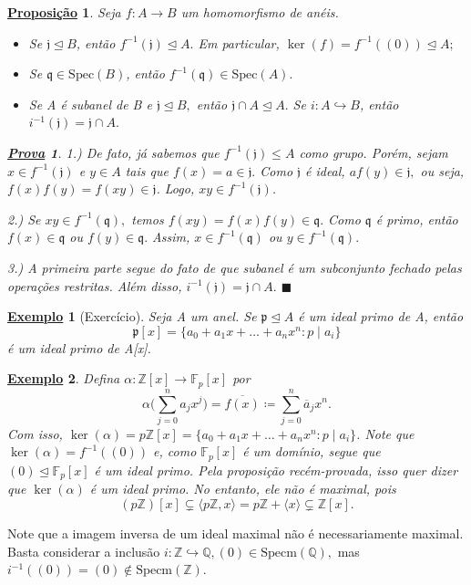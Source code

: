 \documentclass{article}
\newtheorem*{prop*}{\underline{Proposi\c c\~ao}}
\newtheorem{example}{\underline{Exemplo}}
\newtheorem*{proof*}{\underline{Prova}}
\renewcommand\qedsymbol{$\blacksquare$}
\begin{document}
\begin{prop*}
  Seja \(f:A\rightarrow B\) um homomorfismo de anéis.
  \begin{itemize}
    \item[1)] Se \(\mathfrak{j}\trianglelefteq{B}\), então \(f^{-1}(\mathfrak{j})\trianglelefteq{A}.\) Em particular, \(\ker{(f)} = f^{-1}((0))\trianglelefteq{A};\)
    \item[2)] Se \(\mathfrak{q}\in \mathrm{Spec}(B)\), então \(f^{-1}(\mathfrak{q})\in \mathrm{Spec}(A).\)
    \item[3)] Se A é subanel de B e \(\mathfrak{j}\trianglelefteq{B},\) então \(\mathfrak{j}\cap A \trianglelefteq{A}.\) Se \(i:A\hookrightarrow B\),
      então \(i^{-1}(\mathfrak{j})=\mathfrak{j}\cap A.\)
  \end{itemize}
  \begin{proof*}
    1.) De fato, já sabemos que \(f^{-1}(\mathfrak{j})\leq A\) como grupo. Porém, sejam \(x\in f^{-1}(\mathfrak{j})\)
    e \(y\in A\) tais que \(f(x) = a\in \mathfrak{j}.\) Como \(\mathfrak{j}\) é ideal, \(af(y)\in \mathfrak{j},\)
    ou seja, \(f(x)f(y) = f(xy)\in \mathfrak{j}\). Logo, \(xy\in f^{-1}(\mathfrak{j})\).

    2.) Se \(xy\in f^{-1}(\mathfrak{q}),\) temos \(f(xy) = f(x)f(y)\in \mathfrak{q}.\) Como \(\mathfrak{q}\) é primo, 
    então \(f(x)\in \mathfrak{q}\) ou \(f(y)\in \mathfrak{q}.\) Assim, \(x\in f^{-1}(\mathfrak{q})\) ou \(y\in f^{-1}(\mathfrak{q}).\)

    3.) A primeira parte segue do fato de que subanel é um subconjunto fechado pelas operações restritas. Além disso,
    \(i^{-1}(\mathfrak{j}) = \mathfrak{j}\cap A.\) \qedsymbol
  \end{proof*}
\end{prop*}
\begin{example}[Exercício]
  Seja A um anel. Se \(\mathfrak{p}\trianglelefteq A\) é um ideal primo de A, então 
  \[
    \mathfrak{p}[x] = \{a_{0} + a_{1}x + \dotsc + a_{n}x^{n}:p\mid a_{i}\}
  \]
é um ideal primo de A[x].
\end{example}
\begin{example}
  Defina \(\alpha :\mathbb{Z}[x]\rightarrow \mathbb{F}_{p}[x]\) por 
  \[
    \alpha \biggl(\sum\limits_{j=0}^{n}a_{j}x^{j}\biggr) = \overline{f(x)}\coloneqq \sum\limits_{j=0}^{n}\overline{a}_{j}x^{n}.
  \]
  Com isso, \(\ker{(\alpha )} = p \mathbb{Z}[x] = \{a_{0} + a_1x + \dotsc +a_{n}x^{n}: p\mid a_{i}\}\). Note que 
\(\ker{(\alpha )} = f^{-1}((0))\) e, como \(\mathbb{F}_{p}[x]\) é um domínio, segue que \((0)\trianglelefteq \mathbb{F}_{p}[x]\) é um ideal primo.
Pela proposição recém-provada, isso quer dizer que \(\ker{(\alpha )}\) é um ideal primo. No entanto, ele não é maximal, pois 
  \[
    (p \mathbb{Z})[x] \subsetneq \langle p \mathbb{Z}, x \rangle = p \mathbb{Z} + \langle x \rangle \subsetneq \mathbb{Z}[x].
  \]
\end{example}
  Note que a imagem inversa de um ideal maximal não é necessariamente maximal.
Basta considerar a inclusão \(i:\mathbb{Z}\hookrightarrow \mathbb{Q}, (0)\in \mathrm{Specm}(\mathbb{Q}),\)
mas \(i^{-1}((0)) = (0)\not\in \mathrm{Specm}(\mathbb{Z}).\)
\end{document}
